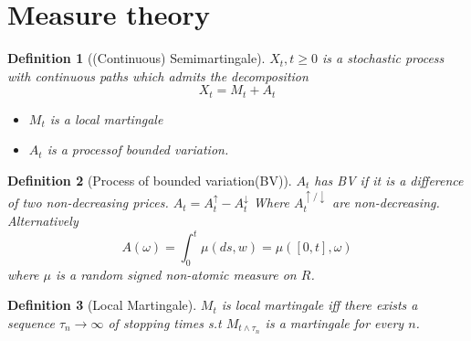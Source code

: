 \documentclass{article}
\newtheorem{definition}{Definition}
\begin{document}
\section{Measure theory}
  
\begin{definition}[(Continuous) Semimartingale]
  $X_t, t \ge 0$ is a stochastic process with continuous paths which admits the decomposition
  $$X_t = M_t + A_t$$
  \begin{itemize}
  \item $M_t$ is a local martingale
  \item $A_t$ is a processof bounded variation.
  \end{itemize}
\end{definition}
\begin{definition}[Process of bounded variation(BV)]
  $A_t$ has BV if it is a difference of two non-decreasing prices.
  $A_t = A_t^{\uparrow} - A_t^{\downarrow}$ Where $A_t^{\uparrow/\downarrow}$ are non-decreasing.
  Alternatively
  $$A(\omega) = \int_0^t \mu(ds, w) = \mu([0, t], \omega)$$
  where $\mu$ is a random signed non-atomic measure on $R$.
\end{definition}
\begin{definition}[Local Martingale]
  $M_t$ is local martingale iff there exists a sequence $\tau_n \rightarrow \infty$ of stopping times s.t $M_{t \wedge \tau_n}$ is a martingale for every $n$.
\end{definition}
\end{document}
